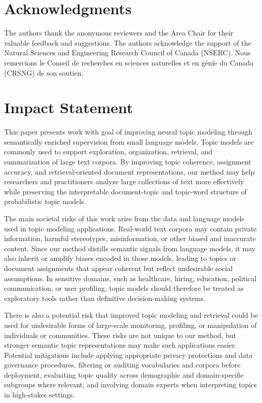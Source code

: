 \documentclass{article}
\theoremstyle{plain}
\theoremstyle{definition}
\theoremstyle{remark}
\begin{document}
\section*{Acknowledgments}
The authors thank the anonymous reviewers and
the Area Chair for their valuable feedback and suggestions. The authors acknowledge the support
of the Natural Sciences and Engineering Research
Council of Canada (NSERC). Nous remercions le
Conseil de recherches en sciences naturelles et en
génie du Canada (CRSNG) de son soutien.

\section*{Impact Statement}

This paper presents work with goal of improving neural topic modeling through semantically enriched supervision from small language models. Topic models are commonly used to support exploration, organization, retrieval, and summarization of large text corpora. By improving topic coherence, assignment accuracy, and retrieval-oriented document representations, our method may help researchers and practitioners analyze large collections of text more effectively while preserving the interpretable document-topic and topic-word structure of probabilistic topic models.

The main societal risks of this work arise from the data and language models used in topic modeling applications. Real-world text corpora may contain private information, harmful stereotypes, misinformation, or other biased and inaccurate content. Since our method distills semantic signals from language models, it may also inherit or amplify biases encoded in those models, leading to topics or document assignments that appear coherent but reflect undesirable social assumptions. In sensitive domains, such as healthcare, hiring, education, political communication, or user profiling, topic models should therefore be treated as exploratory tools rather than definitive decision-making systems.

There is also a potential risk that improved topic modeling and retrieval could be used for undesirable forms of large-scale monitoring, profiling, or manipulation of individuals or communities. These risks are not unique to our method, but stronger semantic topic representations may make such applications easier. Potential mitigations include applying appropriate privacy protections and data governance procedures, filtering or auditing vocabularies and corpora before deployment, evaluating topic quality across demographic and domain-specific subgroups where relevant, and involving domain experts when interpreting topics in high-stakes settings.
\end{document}
